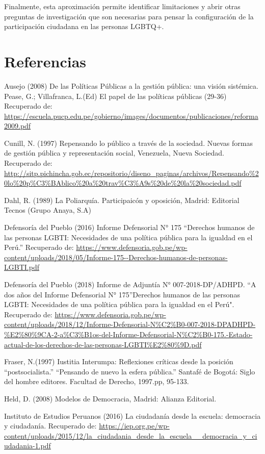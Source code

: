 \documentclass[
]{book}
\theoremstyle{definition}
\theoremstyle{definition}
\theoremstyle{definition}
\theoremstyle{definition}
\theoremstyle{remark}
\begin{document}
Finalmente, esta aproximación permite identificar limitaciones y abrir otras preguntas de investigación que son necesarias para pensar la configuración de la participación ciudadana en las personas LGBTQ+.

\hypertarget{referencias}{%
\section{Referencias}\label{referencias}}

Ausejo (2008) De las Políticas Públicas a la gestión pública: una visión sistémica. Pease, G.; Villafranca, L.(Ed) El papel de las políticas públicas (29-36) Recuperado de: \url{https://escuela.pucp.edu.pe/gobierno/images/documentos/publicaciones/reforma2009.pdf}

Cunill, N. (1997) Repensando lo público a través de la sociedad. Nuevas formas de gestión pública y representación social, Venezuela, Nueva Sociedad. Recuperado de: \url{http://sitp.pichincha.gob.ec/repositorio/diseno_paginas/archivos/Repensando\%20lo\%20p\%C3\%BAblico\%20a\%20trav\%C3\%A9s\%20de\%20la\%20sociedad.pdf}

Dahl, R. (1989) La Poliarquía. Participaicón y oposición, Madrid: Editorial Tecnos (Grupo Anaya, S.A)

Defensoría del Pueblo (2016) Informe Defensorial N° 175 ``Derechos humanos de las personas LGBTI: Necesidades de una política pública para la igualdad en el Perú.'' Recuperado de: \url{https://www.defensoria.gob.pe/wp-content/uploads/2018/05/Informe-175--Derechos-humanos-de-personas-LGBTI.pdf}

Defensoría del Pueblo (2018) Informe de Adjuntía N° 007-2018-DP/ADHPD. ``A dos años del Informe Defensorial N° 175''Derechos humanos de las personas LGBTI: Necesidades de una política pública para la igualdad en el Perú". Recuperado de: \url{https://www.defensoria.gob.pe/wp-content/uploads/2018/12/Informe-Defensorial-N\%C2\%B0-007-2018-DPADHPD-\%E2\%80\%9CA-2-a\%C3\%B1os-del-Informe-Defensorial-N\%C2\%B0-175.-Estado-actual-de-los-derechos-de-las-personas-LGBTI\%E2\%80\%9D.pdf}

Fraser, N.(1997) Iustitia Interumpa: Reflexiones críticas desde la posición ``postsocialista.'' ``Pensando de nuevo la esfera pública.'' Santafé de Bogotá: Siglo del hombre editores. Facultad de Derecho, 1997.pp, 95-133.

Held, D. (2008) Modelos de Democracia, Madrid: Alianza Editorial.

Instituto de Estudios Peruanos (2016) La ciudadanía desde la escuela: democracia y ciudadanía. Recuperado de: \url{https://iep.org.pe/wp-content/uploads/2015/12/la_ciudadania_desde_la_escuela__democracia_y_ciudadania-1.pdf}
\end{document}
